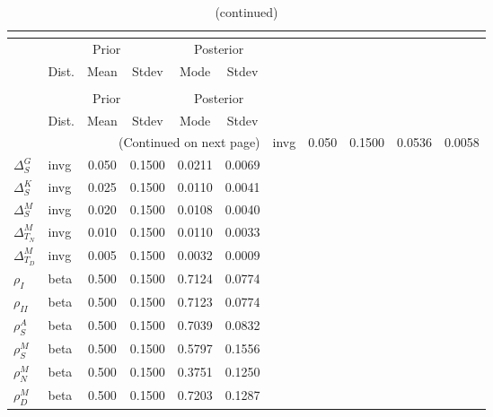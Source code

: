  
\begin{center}
\begin{longtable}{llcccc} 
\caption{Results from posterior maximization (parameters)}\\
 \label{Table:Posterior:1}\\
\toprule 
  & \multicolumn{3}{c}{Prior}  &  \multicolumn{2}{c}{Posterior} \\
  \cmidrule(r{.75em}){2-4} \cmidrule(r{.75em}){5-6}
  & Dist. & Mean  & Stdev & Mode & Stdev \\ 
\midrule \endfirsthead 
\caption{(continued)}\\
 \bottomrule 
  & \multicolumn{3}{c}{Prior}  &  \multicolumn{2}{c}{Posterior} \\
  \cmidrule(r{.75em}){2-4} \cmidrule(r{.75em}){5-6}
  & Dist. & Mean  & Stdev & Mode & Stdev \\ 
\midrule \endhead 
\bottomrule \multicolumn{6}{r}{(Continued on next page)}\endfoot 
\bottomrule\endlastfoot 
${\Delta^{A}_{S}}$ & invg &   0.050 & 0.1500 &   0.0536 &  0.0058 \\ 
${\Delta^{G}_{S}}$ & invg &   0.050 & 0.1500 &   0.0211 &  0.0069 \\ 
${\Delta^{K}_{S}}$ & invg &   0.025 & 0.1500 &   0.0110 &  0.0041 \\ 
${\Delta^{M}_{S}}$ & invg &   0.020 & 0.1500 &   0.0108 &  0.0040 \\ 
${\Delta^{M}_{T_N}}$ & invg &   0.010 & 0.1500 &   0.0110 &  0.0033 \\ 
${\Delta^{M}_{T_D}}$ & invg &   0.005 & 0.1500 &   0.0032 &  0.0009 \\ 
${\rho_{I}}$ & beta &   0.500 & 0.1500 &   0.7124 &  0.0774 \\ 
${\rho_{II}}$ & beta &   0.500 & 0.1500 &   0.7123 &  0.0774 \\ 
${\rho^{A}_{S}}$ & beta &   0.500 & 0.1500 &   0.7039 &  0.0832 \\ 
${\rho^{M}_{S}}$ & beta &   0.500 & 0.1500 &   0.5797 &  0.1556 \\ 
${\rho^{M}_{N}}$ & beta &   0.500 & 0.1500 &   0.3751 &  0.1250 \\ 
${\rho^{M}_{D}}$ & beta &   0.500 & 0.1500 &   0.7203 &  0.1287 \\ 
\end{longtable}
 \end{center}
